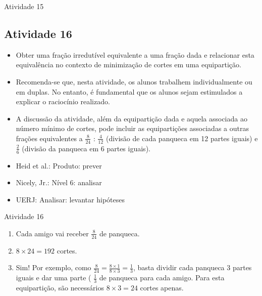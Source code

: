 \begin{multicols}{2}
\begin{resposta*}{Atividade 15}
  
\end{resposta*}



\subsection{Atividade 16}
  
\begin{itemize} %
    \item       Obter uma fração irredutível equivalente a uma fração dada e 
relacionar esta equivalência no contexto de minimização de cortes em uma 
equipartição.
\end{itemize} %
  
 
\begin{itemize} %
    \item       Recomenda-se que, nesta atividade, os alunos trabalhem 
individualmente ou em duplas. No entanto, é fundamental que os alunos sejam 
estimulados a explicar o raciocínio realizado.
    \item       A discussão da atividade, além da equipartição dada e aquela 
associada ao número mínimo de cortes, pode incluir as equipartições associadas a 
outras frações equivalentes a       $\frac{8}{24}$      :       $\frac{4}{12}$   
    (divisão de cada panqueca em 12 partes iguais) e       $\frac{2}{6}$       
(divisão da panqueca em 6 partes iguais).
\end{itemize} %
  
  
   \vspace{.1cm}
  
 \vspace{.1cm}
   
\begin{itemize} %
    \item       Heid et al.: Produto: prever
    \item       Nicely, Jr.: Nível 6: analisar
    \item       UERJ: Analisar: levantar hipóteses
\end{itemize} %
  

\begin{resposta*}{Atividade 16}
\begin{enumerate} [\quad a)] %
    \item       Cada amigo vai receber       $\frac{8}{24}$       de panqueca.
    \item             $8 \times 24 = 192$       cortes.
    \item       Sim! Por exemplo, como       $\frac{8}{24} = \frac{8 \times 1}{8 
\times 3} = \frac{1}{3}$, basta dividir cada panqueca       $3$       partes 
iguais e dar uma parte (      $\frac{1}{3}$       de panqueca para cada amigo. 
Para esta equipartição, são necessários       $8 \times 3 = 24$       cortes 
apenas.
\end{enumerate} %
  

\end{resposta*}
\end{multicols}

